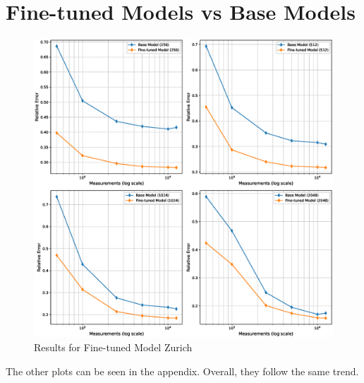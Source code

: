 \section{Fine-tuned Models vs Base Models}
\begin{figure}[h!]
    \centering
    \includegraphics[width=\textwidth]{figures/06_results/fine_tuned_zuerich.eps}
    \caption{Results for Fine-tuned Model Zurich}
\end{figure}
The other plots can be seen in the appendix.
Overall, they follow the same trend.

